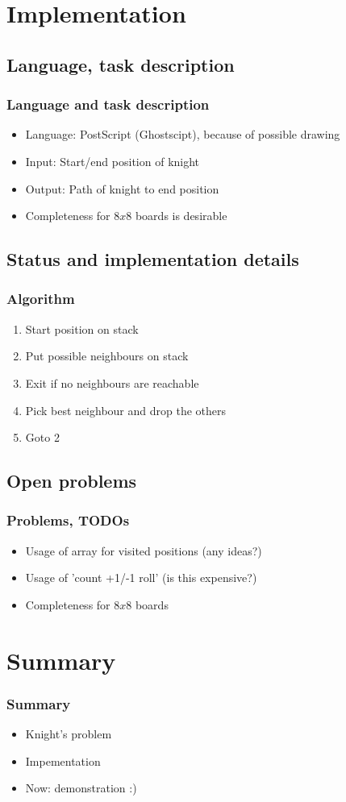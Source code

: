 \documentclass{beamer}
\begin{document}
\section{Implementation}
\subsection{Language, task description}
\begin{frame}
\frametitle{Language and task description}
\begin{itemize}
	\item Language: PostScript (Ghostscipt), because of possible drawing
	\item Input: Start/end position of knight
	\item Output: Path of knight to end position
	\item Completeness for $8 x 8$ boards is desirable
\end{itemize}
\end{frame}

\subsection{Status and implementation details}
\begin{frame}
\frametitle{Algorithm}
\begin{enumerate}
	\item Start position on stack
	\item Put possible neighbours on stack
	\item Exit if no neighbours are reachable
	\item Pick best neighbour and drop the others
	\item Goto 2
\end{enumerate}
\end{frame}

\subsection{Open problems}
\begin{frame}
\frametitle{Problems, TODOs}
\begin{itemize}
	\item Usage of array for visited positions (any ideas?)
	\item Usage of 'count +1/-1 roll' (is this expensive?)
	\item Completeness for $8 x 8$ boards
\end{itemize}
\end{frame}

\section{Summary}
\begin{frame}
\frametitle{Summary}
\begin{itemize}
	\item Knight's problem
	\item Impementation
	\item Now: demonstration :)
\end{itemize}
\end{frame}
\end{document}
